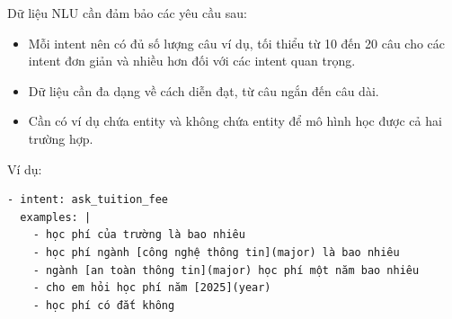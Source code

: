 Dữ liệu NLU cần đảm bảo các yêu cầu sau:
\begin{itemize}
    \item Mỗi intent nên có đủ số lượng câu ví dụ, tối thiểu từ 10 đến 20 câu cho các intent đơn giản và nhiều hơn đối với các intent quan trọng.
    \item Dữ liệu cần đa dạng về cách diễn đạt, từ câu ngắn đến câu dài.
    \item Cần có ví dụ chứa entity và không chứa entity để mô hình học được cả hai trường hợp.
\end{itemize}

Ví dụ:

\begin{verbatim}
- intent: ask_tuition_fee
  examples: |
    - học phí của trường là bao nhiêu
    - học phí ngành [công nghệ thông tin](major) là bao nhiêu
    - ngành [an toàn thông tin](major) học phí một năm bao nhiêu
    - cho em hỏi học phí năm [2025](year)
    - học phí có đắt không
\end{verbatim}
